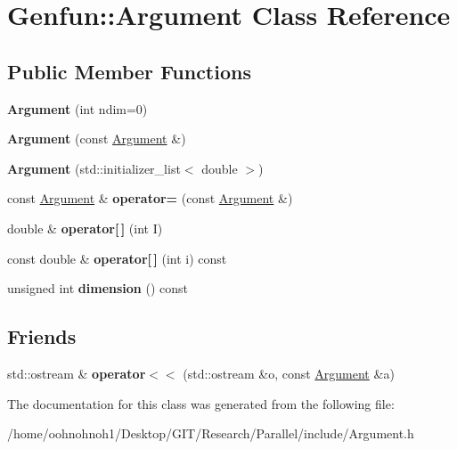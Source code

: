 \hypertarget{classGenfun_1_1Argument}{}\section{Genfun\+:\+:Argument Class Reference}
\label{classGenfun_1_1Argument}
\subsection*{Public Member Functions}
\begin{DoxyCompactItemize}
\item 
\mbox{\label{classGenfun_1_1Argument_a0cfac9652713b678f0249603d05c1966}} 
{\bfseries Argument} (int ndim=0)
\item 
\mbox{\label{classGenfun_1_1Argument_a8d8998f579458abad064b13c3eec3a4d}} 
{\bfseries Argument} (const \hyperlink{classGenfun_1_1Argument}{Argument} \&)
\item 
\mbox{\label{classGenfun_1_1Argument_a1d266c6d4ab1b8dce3233bc72b88662a}} 
{\bfseries Argument} (std\+::initializer\+\_\+list$<$ double $>$)
\item 
\mbox{\label{classGenfun_1_1Argument_a34d82cbd5d6ab7264e6dbf79068bf64a}} 
const \hyperlink{classGenfun_1_1Argument}{Argument} \& {\bfseries operator=} (const \hyperlink{classGenfun_1_1Argument}{Argument} \&)
\item 
\mbox{\label{classGenfun_1_1Argument_ab5fff9deb9e44a506b1952fce72f6ab8}} 
double \& {\bfseries operator\mbox{[}$\,$\mbox{]}} (int I)
\item 
\mbox{\label{classGenfun_1_1Argument_a75d8928f3d573f6e99be1edd790cd0bd}} 
const double \& {\bfseries operator\mbox{[}$\,$\mbox{]}} (int i) const
\item 
\mbox{\label{classGenfun_1_1Argument_a6c696307d883b16685a8e595d7459065}} 
unsigned int {\bfseries dimension} () const
\end{DoxyCompactItemize}
\subsection*{Friends}
\begin{DoxyCompactItemize}
\item 
\mbox{\label{classGenfun_1_1Argument_a142c32217bc4a162ab64e332a6bffe47}} 
std\+::ostream \& {\bfseries operator$<$$<$} (std\+::ostream \&o, const \hyperlink{classGenfun_1_1Argument}{Argument} \&a)
\end{DoxyCompactItemize}


The documentation for this class was generated from the following file\+:\begin{DoxyCompactItemize}
\item 
/home/oohnohnoh1/\+Desktop/\+G\+I\+T/\+Research/\+Parallel/include/Argument.\+h\end{DoxyCompactItemize}
